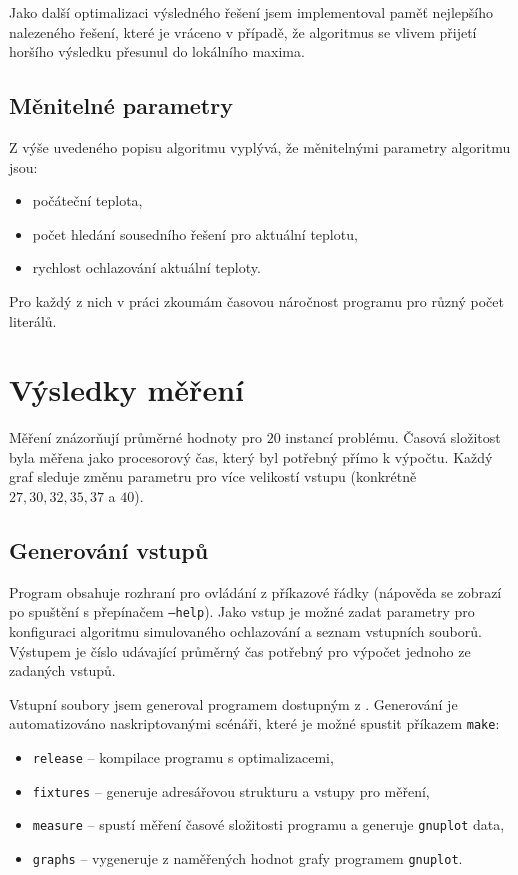 \documentclass[czech]{article}
\begin{document}
Jako další optimalizaci výsledného řešení jsem implementoval paměť nejlepšího nalezeného řešení, které je vráceno v případě, že algoritmus se vlivem přijetí horšího výsledku přesunul do lokálního maxima.

\subsection*{Měnitelné parametry}

Z výše uvedeného popisu algoritmu vyplývá, že měnitelnými parametry algoritmu jsou:

\begin{itemize}
    \item počáteční teplota,
    \item počet hledání sousedního řešení pro aktuální teplotu,
    \item rychlost ochlazování aktuální teploty.
\end{itemize}

Pro každý z nich v práci zkoumám časovou náročnost programu pro různý počet literálů.

\section{Výsledky měření}

Měření znázorňují průměrné hodnoty pro $20$ instancí problému.
Časová složitost byla měřena jako procesorový čas, který byl potřebný přímo k výpočtu.
Každý graf sleduje změnu parametru pro více velikostí vstupu (konkrétně $27, 30, 32, 35, 37$ a $40$).

\subsection{Generování vstupů}

Program obsahuje rozhraní pro ovládání z příkazové řádky (nápověda se zobrazí po spuštění s přepínačem \texttt{--help}).
Jako vstup je možné zadat parametry pro konfiguraci algoritmu simulovaného ochlazování a seznam vstupních souborů.
Výstupem je číslo udávající průměrný čas potřebný pro výpočet jednoho ze zadaných vstupů.

Vstupní soubory jsem generoval programem dostupným z \cite{fw-gen}.
Generování je automatizováno naskriptovanými scénáři, které je možné spustit příkazem \texttt{make}:

\begin{itemize}
    \item \texttt{release} -- kompilace programu s optimalizacemi,
    \item \texttt{fixtures} -- generuje adresářovou strukturu a vstupy pro měření,
    \item \texttt{measure} -- spustí měření časové složitosti programu a generuje \texttt{gnuplot} data,
    \item \texttt{graphs} -- vygeneruje z naměřených hodnot grafy programem \texttt{gnuplot}.
\end{itemize}
\end{document}

